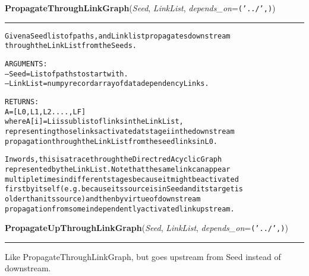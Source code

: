     \label{System:LinkManagement:PropagateThroughLinkGraph}

    \vspace{0.5ex}

\hspace{.8\funcindent}\begin{boxedminipage}{\funcwidth}

    \raggedright \textbf{PropagateThroughLinkGraph}(\textit{Seed}, \textit{LinkList}, \textit{depends\_on}={\tt ('../',)})

    \vspace{-1.5ex}

    \rule{\textwidth}{0.5\fboxrule}
\setlength{\parskip}{2ex}
\begin{alltt}

Given a Seed list of paths, and Linklist propagates downstream 
through the LinkList from the Seeds. 

ARGUMENTS:
--Seed = List of paths to start with.   
--LinkList = numpy record array of data dependency Links.
                                        
RETURNS:
        A = [L0,L1,L2 ...., LF]
where A[i]  = Li is sublist of links in the LinkList, 
representing those links activated at stage i in the downstream 
propagation through the LinkList from the seed links in L0.  
        
In words, this is a trace through the Directred Acyclic Graph 
represented by the LinkList.   Note that the same link can appear
multiple times in different stages because it might be activated 
first by itself (e.g. because its source is in Seed and its target is 
older than its source) and then by virtue of downstream 
propagation from some independently activated link upstream. 
                
\end{alltt}

\setlength{\parskip}{1ex}
    \end{boxedminipage}

    \label{System:LinkManagement:PropagateUpThroughLinkGraph}

    \vspace{0.5ex}

\hspace{.8\funcindent}\begin{boxedminipage}{\funcwidth}

    \raggedright \textbf{PropagateUpThroughLinkGraph}(\textit{Seed}, \textit{LinkList}, \textit{depends\_on}={\tt ('../',)})

    \vspace{-1.5ex}

    \rule{\textwidth}{0.5\fboxrule}
\setlength{\parskip}{2ex}
    Like PropagateThroughLinkGraph, but goes upstream from Seed instead of 
    downstream.

\setlength{\parskip}{1ex}
    \end{boxedminipage}

